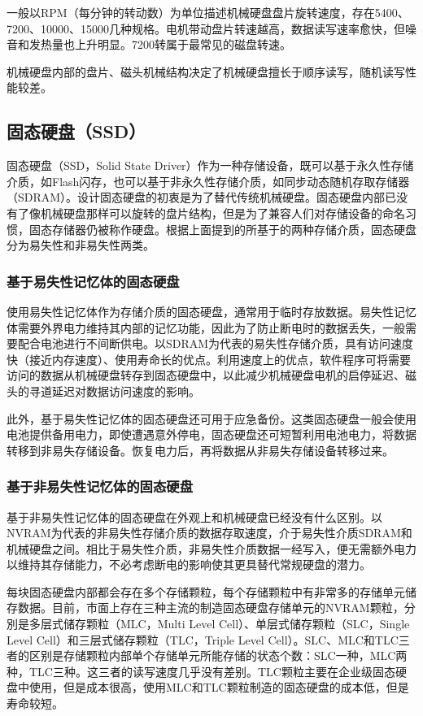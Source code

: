 一般以RPM（每分钟的转动数）为单位描述机械硬盘盘片旋转速度，存在5400、7200、10000、15000几种规格。电机带动盘片转速越高，数据读写速率愈快，但噪音和发热量也上升明显。7200转属于最常见的磁盘转速。

机械硬盘内部的盘片、磁头机械结构决定了机械硬盘擅长于顺序读写，随机读写性能较差。

\subsection{固态硬盘（SSD）}
固态硬盘\cite{ssd2009}（SSD，Solid State Driver）作为一种存储设备，既可以基于永久性存储介质，如Flash闪存，也可以基于非永久性存储介质，如同步动态随机存取存储器（SDRAM）。设计固态硬盘的初衷是为了替代传统机械硬盘。固态硬盘内部已没有了像机械硬盘那样可以旋转的盘片结构，但是为了兼容人们对存储设备的命名习惯，固态存储器仍被称作硬盘。根据上面提到的所基于的两种存储介质，固态硬盘分为易失性和非易失性两类。

\subsubsection{基于易失性记忆体的固态硬盘}

使用易失性记忆体作为存储介质的固态硬盘，通常用于临时存放数据。易失性记忆体需要外界电力维持其内部的记忆功能，因此为了防止断电时的数据丢失，一般需要配合电池进行不间断供电。以SDRAM为代表的易失性存储介质，具有访问速度快（接近内存速度）、使用寿命长的优点。利用速度上的优点，软件程序可将需要访问的数据从机械硬盘转存到固态硬盘中，以此减少机械硬盘电机的启停延迟、磁头的寻道延迟对数据访问速度的影响。

此外，基于易失性记忆体的固态硬盘还可用于应急备份。这类固态硬盘一般会使用电池提供备用电力，即使遭遇意外停电，固态硬盘还可短暂利用电池电力，将数据转移到非易失存储设备。恢复电力后，再将数据从非易失存储设备转移过来。

\subsubsection{基于非易失性记忆体的固态硬盘}

基于非易失性记忆体的固态硬盘在外观上和机械硬盘已经没有什么区别。以NVRAM为代表的非易失性存储介质的数据存取速度，介于易失性介质SDRAM和机械硬盘之间。相比于易失性介质，非易失性介质数据一经写入，便无需额外电力以维持其存储能力，不必考虑断电的影响使其更具替代常规硬盘的潜力。

每块固态硬盘内部都会存在多个存储颗粒，每个存储颗粒中有非常多的存储单元储存数据。目前，市面上存在三种主流的制造固态硬盘存储单元的NVRAM颗粒，分別是多层式储存颗粒（MLC，Multi Level Cell）、单层式储存颗粒（SLC，Single Level Cell）和三层式储存颗粒（TLC，Triple Level Cell）。SLC、MLC和TLC三者的区别是存储颗粒内部单个存储单元所能存储的状态个数：SLC一种，MLC两种，TLC三种。这三者的读写速度几乎没有差别。TLC颗粒主要在企业级固态硬盘中使用，但是成本很高，使用MLC和TLC颗粒制造的固态硬盘的成本低，但是寿命较短。

